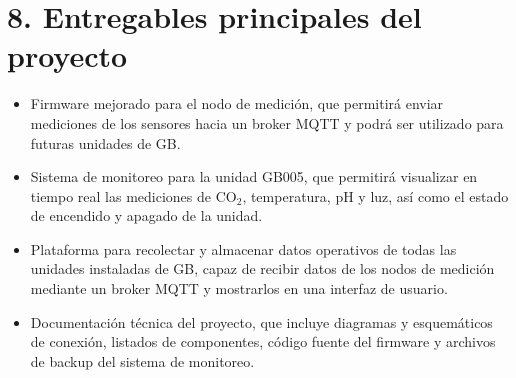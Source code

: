 \documentclass[
11pt, %
]{charter}
\begin{document}
\section{8. Entregables principales del proyecto}
\label{sec:entregables}
\begin{itemize}
\item Firmware mejorado para el nodo de medición, que permitirá enviar mediciones de los sensores hacia un broker MQTT y podrá ser utilizado para futuras unidades de GB.

\item Sistema de monitoreo para la unidad GB005, que permitirá visualizar en tiempo real las mediciones de CO$_2$, temperatura, pH y luz, así como el estado de encendido y apagado de la unidad.

\item Plataforma para recolectar y almacenar datos operativos de todas las unidades instaladas de GB, capaz de recibir datos de los nodos de medición mediante un broker MQTT y mostrarlos en una interfaz de usuario.

\item Documentación técnica del proyecto, que incluye diagramas y esquemáticos de conexión, listados de componentes, código fuente del firmware y archivos de backup del sistema de monitoreo.
\end{itemize}
\end{document}
